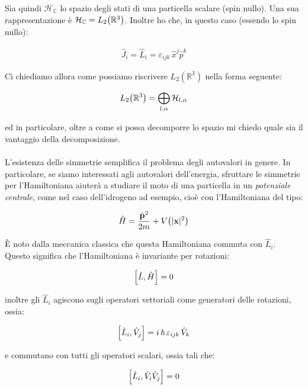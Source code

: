 	Sia quindi $\mathcal{H}_{\mathbb{C}}$ lo spazio degli stati di una particella scalare (spin nullo). Una sua rappresentazione è $\mathcal{H}_{\mathbb{C}} = L_2\qty(\mathbb{R}^3)$. Inoltre ho che, in questo caso (essendo lo spin nullo):
	
\begin{align*}
	\hat{J}_i = \hat{L}_i = \varepsilon_{ijk} \, \hat{x}^j \hat{p}^k
\end{align*}

	Ci chiediamo allora come possiamo riscrivere $L_2(\mathbb{R}^3)$ nella forma seguente:
	
\begin{align*}
	L_2\qty(\mathbb{R}^3) = \bigoplus_{l, \alpha} \mathcal{H}_{l, \alpha}
\end{align*}

	ed in particolare, oltre a come si possa decomporre lo spazio mi chiedo quale sia il vantaggio della decomposizione.
	\\
	\\
	L'esistenza delle simmetrie semplifica il problema degli autovalori in genere. In particolare, se siamo interessati agli autovalori dell'energia, sfruttare le simmetrie per l'Hamiltoniana aiuterà a studiare il moto di una particella in un \textit{potenziale centrale}, come nel caso dell'idrogeno ad esempio, cioè con l'Hamiltoniana del tipo:
	
\begin{align*}
	\hat{H} = \frac{\hat{\vb{p}}^2}{2m} + V\qty(|\vb{x}|^2)
\end{align*}

	È noto dalla meccanica classica che questa Hamiltoniana commuta con $\hat{L}_i$. Questo significa che l'Hamiltoniana è invariante per rotazioni:

\begin{align*}
	\qty[\hat{L}, \hat{H}] = 0
\end{align*}

	inoltre gli $\hat{L}_i$ agiscono sugli operatori vettoriali come generatori delle rotazioni, ossia:
	
\begin{align*}
	\qty[\hat{L}_i, \hat{V}_j] = i \, \hbar \, \varepsilon_{i j k} \, \hat{V}_k 
\end{align*}
	
	e commutano con tutti gli operatori scalari, ossia tali che:
	
\begin{align*}
	\qty[\hat{L}_i, \hat{V}_i \hat{V}_j] = 0
\end{align*}

